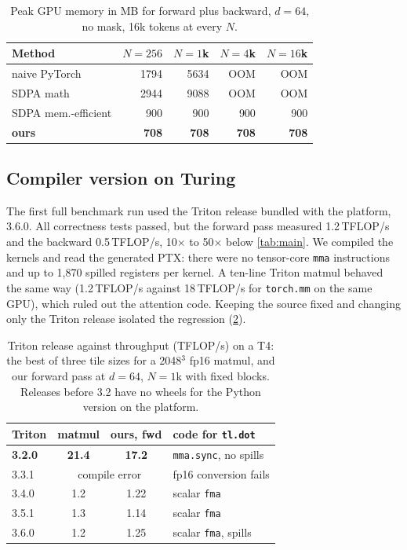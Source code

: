 \documentclass[10pt,twocolumn,letterpaper]{article}
\newcommand{\TF}{\,TFLOP/s}
\begin{document}
\begin{table}[t]
\centering
\footnotesize
\begin{tabular}{@{}lrrrr@{}}
\toprule
Method & $N{=}256$ & $N{=}1$k & $N{=}4$k & $N{=}16$k \\
\midrule
naive PyTorch & 1794 & 5634 & OOM & OOM \\
SDPA math & 2944 & 9088 & OOM & OOM \\
SDPA mem.-efficient & 900 & 900 & 900 & 900 \\
\textbf{ours} & \textbf{708} & \textbf{708} & \textbf{708} & \textbf{708} \\
\bottomrule
\end{tabular}
\caption{Peak GPU memory in MB for forward plus backward, $d = 64$, no mask,
16k tokens at every $N$.}
\label{tab:mem}
\end{table}

\subsection{Compiler version on Turing}
\label{sec:triton}

The first full benchmark run used the Triton release bundled with the
platform, 3.6.0. All correctness tests passed, but the forward pass measured
1.2\TF{} and the backward 0.5\TF{}, 10$\times$ to 50$\times$ below
\cref{tab:main}. We compiled the kernels and read the generated PTX: there
were no tensor-core \texttt{mma} instructions and up to 1,870 spilled registers
per kernel. A ten-line Triton matmul behaved the same way (1.2\TF{} against
18\TF{} for \texttt{torch.mm} on the same GPU), which ruled out the attention
code. Keeping the source fixed and changing only the Triton release isolated
the regression (\cref{tab:triton}).

\begin{table}[t]
\centering
\footnotesize
\setlength{\tabcolsep}{4pt}
\begin{tabular}{@{}lccl@{}}
\toprule
Triton & matmul & ours, fwd & code for \texttt{tl.dot} \\
\midrule
\textbf{3.2.0} & \textbf{21.4} & \textbf{17.2} & \texttt{mma.sync}, no spills \\
3.3.1 & \multicolumn{2}{c}{compile error} & fp16 conversion fails \\
3.4.0 & 1.2 & 1.22 & scalar \texttt{fma} \\
3.5.1 & 1.3 & 1.14 & scalar \texttt{fma} \\
3.6.0 & 1.2 & 1.25 & scalar \texttt{fma}, spills \\
\bottomrule
\end{tabular}
\caption{Triton release against throughput (TFLOP/s) on a T4: the best of
three tile sizes for a 2048$^3$ fp16 matmul, and our forward pass at $d=64$,
$N=1$k with fixed blocks. Releases before 3.2 have no wheels for the Python
version on the platform.}
\label{tab:triton}
\end{table}
\end{document}
